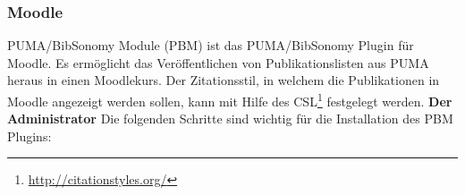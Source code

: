 \documentclass[b5paper,11pt,twoside]{scrbook} %
\begin{document}
\subsubsection{Moodle}
PUMA/BibSonomy Module (PBM) ist das PUMA/BibSonomy Plugin für Moodle. Es ermöglicht das Veröffentlichen von Publikationslisten aus PUMA heraus in einen Moodlekurs. Der Zitationsstil, in welchem die Publikationen in Moodle angezeigt werden sollen, kann mit Hilfe des CSL\footnote{\url{http://citationstyles.org/}} festgelegt werden.\newline
\textbf{ Der Administrator}\newline
Die folgenden Schritte sind wichtig für die Installation des PBM Plugins: 


\newpage   
\end{document}
